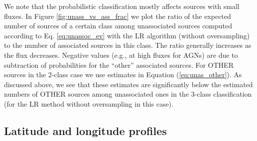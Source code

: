 We note that the probabilistic classification mostly affects sources with small fluxes.
In Figure \ref{fig:unass_vs_ass_frac} we plot the ratio of the expected number of sources of a certain class among unassociated sources
computed according to Eq. \ref{eq:unassoc_ev} with the LR algorithm (without oversampling) to the number of associated sources in this class.
The ratio generally increases as the flux decreases.
Negative values (e.g., at high fluxes for AGNs) are due to subtraction of probabilities for the ``other'' associated sources.
For OTHER sources in the 2-class case we use estimates in Equation (\ref{eq:unas_other}).
As discussed above, we see that these estimates are significantly below the estimated numbers of OTHER sources among unassociated ones in the 3-class classification (for the LR method without oversampling in this case).


\subsection{Latitude and longitude profiles}

